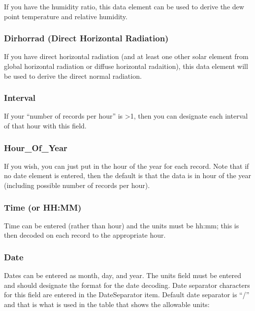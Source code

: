 If you have the humidity ratio, this data element can be used to derive the dew point temperature and relative humidity.

\subsubsection{Dirhorrad (Direct Horizontal Radiation)}\label{dirhorrad-direct-horizontal-radiation}

If you have direct horizontal radiation (and at least one other solar element from global horizontal radiation or diffuse horizontal radaition), this data element will be used to derive the direct normal radiation.

\subsubsection{Interval}\label{interval}

If your ``number of records per hour'' is \textgreater{}1, then you can designate each interval of that hour with this field.

\subsubsection{Hour\_Of\_Year}\label{hourux5fofux5fyear}

If you wish, you can just put in the hour of the year for each record. Note that if no date element is entered, then the default is that the data is in hour of the year (including possible number of records per hour).

\subsubsection{Time (or HH:MM)}\label{time-or-hhmm}

Time can be entered (rather than hour) and the units must be hh:mm; this is then decoded on each record to the appropriate hour.

\subsubsection{Date}\label{date}

Dates can be entered as month, day, and year. The units field must be entered and should designate the format for the date decoding. Date separator characters for this field are entered in the DateSeparator item. Default date separator is ``/'' and that is what is used in the table that shows the allowable units:

